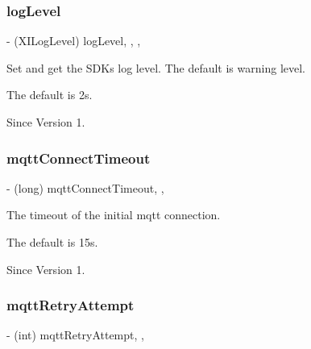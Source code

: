 \subsubsection{\texorpdfstring{log\+Level}{logLevel}}
{\footnotesize\ttfamily -\/ (X\+I\+Log\+Level) log\+Level\hspace{0.3cm}{\ttfamily [read]}, {\ttfamily [write]}, {\ttfamily [nonatomic]}, {\ttfamily [assign]}}



Set and get the S\+DK\textquotesingle{}s log level. The default is warning level. 

The default is 2s. \begin{DoxySince}{Since}
Version 1. 
\end{DoxySince}
\hypertarget{class_x_i_sdk_config_abd757758fc57eeb6b4962078944675d4}{}\label{class_x_i_sdk_config_abd757758fc57eeb6b4962078944675d4} 
\subsubsection{\texorpdfstring{mqtt\+Connect\+Timeout}{mqttConnectTimeout}}
{\footnotesize\ttfamily -\/ (long) mqtt\+Connect\+Timeout\hspace{0.3cm}{\ttfamily [read]}, {\ttfamily [nonatomic]}, {\ttfamily [assign]}}



The timeout of the initial mqtt connection. 

The default is 15s. \begin{DoxySince}{Since}
Version 1. 
\end{DoxySince}
\hypertarget{class_x_i_sdk_config_ac8b3d3418421adc422c9cd5ce4c88582}{}\label{class_x_i_sdk_config_ac8b3d3418421adc422c9cd5ce4c88582} 
\subsubsection{\texorpdfstring{mqtt\+Retry\+Attempt}{mqttRetryAttempt}}
{\footnotesize\ttfamily -\/ (int) mqtt\+Retry\+Attempt\hspace{0.3cm}{\ttfamily [read]}, {\ttfamily [nonatomic]}, {\ttfamily [assign]}}



